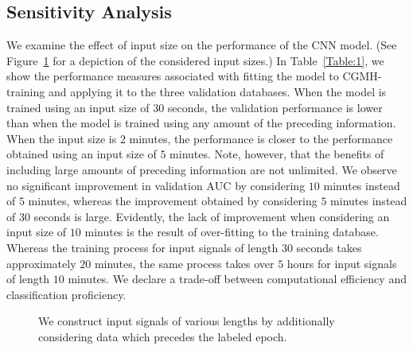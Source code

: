 \documentclass[10pt,a4paper,english]{amsart}
\begin{document}
\subsection{Sensitivity Analysis}

We examine the effect of input size on the performance of the CNN model. (See Figure~\ref{Fig:EpochLength} for a depiction of the considered input sizes.) In Table~\ref{Table:1}, we show the performance measures associated with fitting the model to CGMH-training and applying it to the three validation databases. When the model is trained using an input size of $30$ seconds, the validation performance is lower than when the model is trained using any amount of the preceding information. When the input size is $2$ minutes, the performance is closer to the performance obtained using an input size of $5$ minutes. Note, however, that the benefits of including large amounts of preceding information are not unlimited.  We observe no significant improvement in validation $\mathrm{AUC}$ by considering $10$ minutes instead of $5$ minutes, whereas the improvement obtained by considering $5$ minutes instead of $30$ seconds is large. Evidently, the lack of improvement when considering an input size of $10$ minutes is the result of over-fitting to the training database.
%
Whereas the training process for input signals of length $30$ seconds takes approximately $20$ minutes, the same process takes over $5$ hours for input signals of length $10$ minutes. We declare a trade-off between computational efficiency and classification proficiency.  

\begin{figure}
\centering
{}
\caption{\label{Fig:EpochLength} We construct input signals of various lengths by additionally considering data which precedes the labeled epoch.}
\end{figure}
\end{document}

